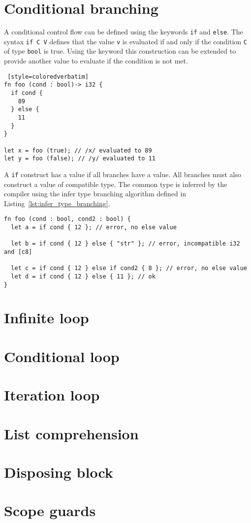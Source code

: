 \section{Conditional branching}%
\label{sec:if_else}

A conditional control flow can be defined using the keywords \texttt{if} and
\texttt{else}. The syntax \texttt{if C V} defines that the value \texttt{v} is
evaluated if and only if the condition \texttt {C} of type \texttt {bool} is
true. Using the keyword this construction can be extended to provide another
value to evaluate if the condition is not met.

\begin{lstlisting} [style=coloredverbatim]
fn foo (cond : bool)-> i32 {
  if cond {
    89
  } else {
    11
  }
}

let x = foo (true); // /x/ evaluated to 89
let y = foo (false); // /y/ evaluated to 11
\end{lstlisting}

A \texttt{if} construct has a value if all branches have a value. All branches
must also construct a value of compatible type. The common type is inferred by
the compiler using the infer type branching algorithm defined in
Listing~\ref{lst:infer_type_branching}.

\begin{lstlisting}[style=coloredverbatim]
fn foo (cond : bool, cond2 : bool) {
  let a = if cond { 12 }; // error, no else value

  let b = if cond { 12 } else { "str" }; // error, incompatible i32 and [c8]

  let c = if cond { 12 } else if cond2 { 8 }; // error, no else value
  let d = if cond { 12 } else { 11 }; // ok
}
\end{lstlisting}

\section{Infinite loop}%
\label{sec:inf_loop}

\section{Conditional loop}%
\label{sec:while_loop}

\section{Iteration loop}%
\label{sec:for_loop}

\section{List comprehension}%
\label{sec:list_compr}

\section{Disposing block}%
\label{sec:with_block}

\section{Scope guards}%
\label{sec:scope_guards}

